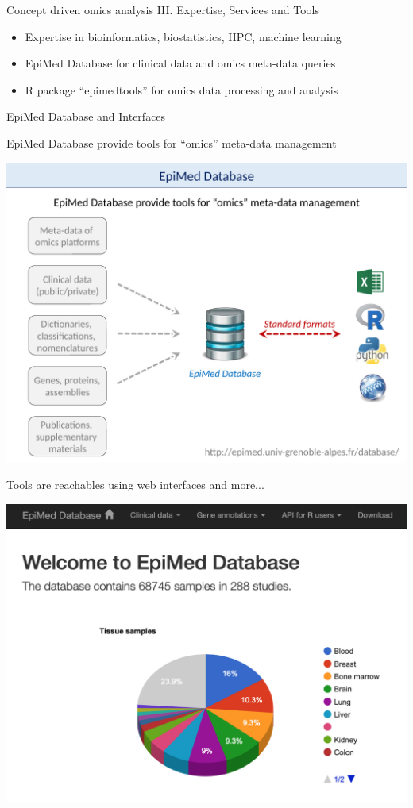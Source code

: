 \documentclass[final]{beamer}
\newlength{\twocolwid}
\begin{document}
\begin{frame}[t]
\begin{columns}[t]
\begin{column}{\twocolwid}
\begin{block}{Concept driven omics analysis}
III. Expertise, Services and Tools 

\begin{itemize}
\item Expertise in bioinformatics, biostatistics, HPC, machine learning
\item EpiMed Database for clinical data and omics meta-data queries
\item R package “epimedtools” for omics data processing and analysis
\end{itemize}

\end{block}


















\begin{block}{EpiMed Database and Interfaces}

EpiMed Database provide tools for “omics” meta-data management

{
\centering
\mbox{\includegraphics[trim = 0mm 0mm 0mm 30mm, clip, width=.6\linewidth]{figs/fig03}}

}

Tools are reachables using web interfaces and more...

{
\centering
\mbox{\includegraphics[trim = 0mm 0mm 0mm 00mm, clip, width=.6\linewidth]{figs/fig03b}}

}
\end{block}
\end{column}
\end{columns}
\end{frame}
\end{document}
